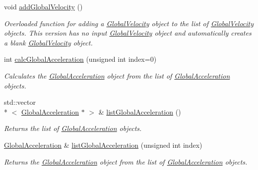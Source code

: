\begin{DoxyCompactItemize}
\hypertarget{classosea_1_1ofreq_1_1_outputs_body_a07a548f3df9fa5aff4223a60f5f1b56c}{void \hyperlink{classosea_1_1ofreq_1_1_outputs_body_a07a548f3df9fa5aff4223a60f5f1b56c}{add\-Global\-Velocity} ()}\label{classosea_1_1ofreq_1_1_outputs_body_a07a548f3df9fa5aff4223a60f5f1b56c}

\begin{DoxyCompactList}\small\item\em Overloaded function for adding a \hyperlink{classosea_1_1ofreq_1_1_global_velocity}{Global\-Velocity} object to the list of \hyperlink{classosea_1_1ofreq_1_1_global_velocity}{Global\-Velocity} objects. This version has no input \hyperlink{classosea_1_1ofreq_1_1_global_velocity}{Global\-Velocity} object and automatically creates a blank \hyperlink{classosea_1_1ofreq_1_1_global_velocity}{Global\-Velocity} object. \end{DoxyCompactList}\item 
int \hyperlink{classosea_1_1ofreq_1_1_outputs_body_a4be242a9a54fef3ba42674f815c7ae61}{calc\-Global\-Acceleration} (unsigned int index=0)
\begin{DoxyCompactList}\small\item\em Calculates the \hyperlink{classosea_1_1ofreq_1_1_global_acceleration}{Global\-Acceleration} object from the list of \hyperlink{classosea_1_1ofreq_1_1_global_acceleration}{Global\-Acceleration} objects. \end{DoxyCompactList}\item 
std\-::vector\\*
$<$ \hyperlink{classosea_1_1ofreq_1_1_global_acceleration}{Global\-Acceleration} $\ast$ $>$ \& \hyperlink{classosea_1_1ofreq_1_1_outputs_body_ad840585a6d2ccb29085477408d877299}{list\-Global\-Acceleration} ()
\begin{DoxyCompactList}\small\item\em Returns the list of \hyperlink{classosea_1_1ofreq_1_1_global_acceleration}{Global\-Acceleration} objects. \end{DoxyCompactList}\item 
\hyperlink{classosea_1_1ofreq_1_1_global_acceleration}{Global\-Acceleration} \& \hyperlink{classosea_1_1ofreq_1_1_outputs_body_a76c051c2dd085912f7803ad89017fbcd}{list\-Global\-Acceleration} (unsigned int index)
\begin{DoxyCompactList}\small\item\em Returns the \hyperlink{classosea_1_1ofreq_1_1_global_acceleration}{Global\-Acceleration} object from the list of \hyperlink{classosea_1_1ofreq_1_1_global_acceleration}{Global\-Acceleration} objects. \end{DoxyCompactList}\item 

\end{DoxyCompactItemize}
